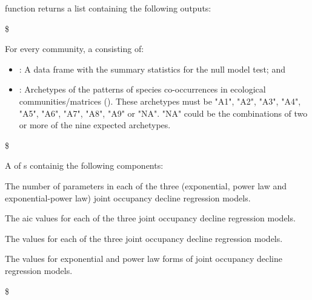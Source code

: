 \documentclass[a4paper]{book}
\begin{document}
\begin{Value}
 function returns a list containing the following outputs:

\$

For every community, a  consisting of:

\begin{itemize}

\item{} : A data frame with the summary statistics for the null model test; and
\item{} : Archetypes of the patterns of species co-occurrences in ecological
communities/matrices (). These archetypes must be \eqn{\in \{}{}"A1",
"A2", "A3", "A4", "A5", "A6", "A7", "A8", "A9"\eqn{\}}{} or "NA". "NA" could be the
combinations of two or more of the nine expected archetypes.
\end{itemize}

\$

A  of s containig the following components:
\begin{ldescription}
\item[\code{\code{df}}] The number of parameters in each of the three (exponential, power law and
exponential-power law) joint occupancy decline regression models.
\item[\code{\code{aic}}] The aic values for each of the three joint occupancy decline regression models.
\item[\code{\code{delta\_aic3}}] The  values for each of the three joint occupancy decline regression
models.
\item[\code{\code{delta\_aic2}}] The  values for exponential and power law forms of joint occupancy
decline regression models.
\end{ldescription}
\$


\end{Value}
\end{document}
